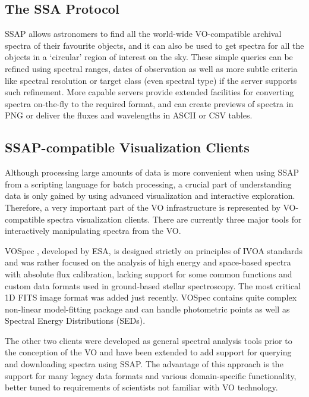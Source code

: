 \documentclass[final,authoryear,5p,times,twocolumn]{elsarticle}
\begin{document}
\subsection{The SSA Protocol}
%
SSAP allows astronomers to find all the world-wide VO-compatible archival
spectra of their favourite objects, and it can also be used to get spectra for all
the objects in a `circular' region of interest on the sky. These simple
queries can be refined using spectral ranges, dates of observation as well as
more subtle criteria like spectral resolution or target class (even
spectral type) if the server supports such refinement. More capable servers
provide extended facilities for converting spectra on-the-fly to the required
format, and can create previews of spectra in PNG or deliver
the fluxes and wavelengths in ASCII or CSV tables.

\subsection{SSAP-compatible  Visualization Clients}

Although processing large amounts of data is more convenient when
using SSAP from a scripting language for batch processing, a crucial
part of understanding data is only gained by using advanced visualization and interactive
exploration.  Therefore, a very important part of the VO
infrastructure is represented by VO-compatible spectra visualization
clients. There are currently three major tools for interactively manipulating
spectra from the VO.

VOSpec \citep[][]{2005ASPC..347..198O}, developed by ESA, is
designed strictly on principles of IVOA standards and was rather focused on
the analysis of high energy and space-based spectra with absolute flux
calibration, lacking support for some common functions and custom data formats
used in ground-based stellar spectroscopy. The most critical 1D FITS image
format was added just recently. VOSpec contains quite complex non-linear
model-fitting package and can handle photometric points as well as Spectral
Energy Distributions (SEDs).

The other two clients were developed as general spectral analysis
tools prior to the conception of the VO and have been extended to add
support for querying and downloading spectra using SSAP.  The
advantage of this approach is the support for many legacy data formats
and various domain-specific functionality, better tuned to
requirements of scientists not familiar with VO technology.
\end{document}
